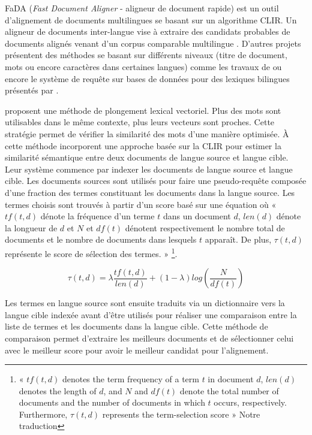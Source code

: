 FaDA (\textit{Fast Document Aligner} - aligneur de document rapide) \citep{lohar_2016} est un outil d'alignement
de documents multilingues se basant sur un algorithme CLIR. Un
aligneur de documents inter-langue vise à extraire des candidats probables de documents
alignés venant d'un corpus comparable multilingue \citep{lohar_2016}. D'autres projets présentent des méthodes
se basant sur différents niveaux (titre de document, mots ou encore caractères dans certaines langues) comme les travaux de
\citet{yang_2003} ou encore le système de requête sur bases de données pour des lexiques bilingues présentés
par \citet{munteanu_2005}.

\citet{lohar_2016} proposent une méthode de plongement lexical vectoriel.
Plus des mots sont utilisables dans le même contexte, plus leurs vecteurs sont proches. Cette stratégie permet
de vérifier la similarité des mots d'une manière optimisée.
À cette méthode \citet{lohar_2016} incorporent une approche basée sur la
CLIR pour estimer la similarité sémantique entre deux documents de langue source et langue cible. Leur système
commence par indexer les documents de langue source et langue cible. Les documents sources sont utilisés pour
faire une pseudo-requête composée d'une fraction des termes constituant les documents dans la langue source.
Les termes choisis sont trouvés à partir d'un score basé sur une équation où {« }$tf(t,d)$ dénote la fréquence
d'un terme $t$ dans un document $d$, $len(d)$ dénote la longueur de $d$ et $N$ et $df(t)$ dénotent respectivement
le nombre total de documents et le nombre de documents dans lesquels $t$ apparaît. De plus, $\tau(t,d)$
représente le score de sélection des termes.{ »} \citep{lohar_2016} \footnote{{« }$tf(t, d)$ denotes the term frequency of a
term $t$ in document $d$, $len(d)$ denotes the length of $d$, and $N$ and $df(t)$ denote the total number of documents and the
number of documents in which $t$ occurs, respectively. Furthermore, $\tau(t, d)$ represents the term-selection score{ »} Notre traduction}.

\[ \tau(t,d)=\lambda\frac{tf(t,d)}{len(d)}+(1-\lambda)log(\frac{N}{df(t)}) \]

Les termes en langue source sont ensuite traduits via un dictionnaire vers la langue cible indexée avant
d'être utilisés pour réaliser une comparaison entre la liste de termes et les documents dans la langue cible.
Cette méthode de comparaison permet d'extraire les meilleurs documents et de sélectionner celui avec le
meilleur score pour avoir le meilleur candidat pour l'alignement.

